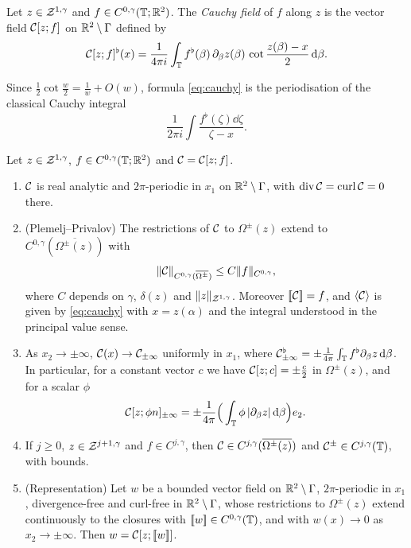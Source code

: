 \begin{definition}\label{def:cauchy}
Let $z\in\mathcal{Z}^{1,\gamma}$ and $f\in C^{0,\gamma}(\mathbb{T};\mathbb{R}^2)$. The \emph{Cauchy field} of $f$ along $z$ is the vector field $\mathcal{C}[z;f]$ on $\mathbb{R}^2\setminus\Gamma$ defined by
\begin{equation}\label{eq:cauchy}
\mathcal{C}[z;f]^\flat(x)=\frac1{4\pi i}\int_{\mathbb{T}} f^\flat(\beta)\,\partial_\beta z(\beta)\,\cot\frac{z(\beta)-x}{2}\,\mathrm{d}\beta .
\end{equation}
\end{definition}

Since $\frac12\cot\frac w2=\frac1w+O(w)$, formula \eqref{eq:cauchy} is the periodisation of the classical Cauchy integral
\[
\frac1{2\pi i}\int\frac{f^\flat(\zeta)\dd\zeta}{\zeta-x}.
\]

\begin{lemma}\label{lem:cauchy}
Let $z\in\mathcal{Z}^{1,\gamma}$, $f\in C^{0,\gamma}(\mathbb{T};\mathbb{R}^2)$ and $\mathcal{C}=\mathcal{C}[z;f]$.
\begin{enumerate}[label=\textup{(\alph*)}]
\item $\mathcal{C}$ is real analytic and $2\pi$-periodic in $x_1$ on $\mathbb{R}^2\setminus\Gamma$, with $\operatorname{div}\mathcal{C}=\operatorname{curl}\mathcal{C}=0$ there.
\item \textup{(Plemelj--Privalov)} The restrictions of $\mathcal{C}$ to $\Omega^\pm(z)$ extend to $C^{0,\gamma}(\overline{\Omega^\pm(z)})$ with
\[
\|\mathcal{C}\|_{C^{0,\gamma}(\overline{\Omega^\pm})}\le C\|f\|_{C^{0,\gamma}},
\]
where $C$ depends on $\gamma$, $\delta(z)$ and $\|z\|_{\mathcal{Z}^{1,\gamma}}$. Moreover
$[\![\mathcal{C}]\!]=f$, and $\langle \mathcal{C}\rangle$ is given by \eqref{eq:cauchy} with $x=z(\alpha)$ and the integral understood in the principal value sense.
\item As $x_2\to\pm\infty$, $\mathcal{C}(x)\to\mathcal{C}_{\pm\infty}$ uniformly in $x_1$, where $\mathcal{C}_{\pm\infty}^\flat=\pm\frac1{4\pi}\int_{\mathbb{T}} f^\flat\partial_\beta z\,\mathrm{d}\beta$.
In particular, for a constant vector $c$ we have $\mathcal{C}[z;c]=\pm\frac c2$ in $\Omega^\pm(z)$, and for a scalar $\phi$
\begin{equation}\label{eq:limit-source}
\mathcal{C}[z;\phi n]_{\pm\infty}=\pm\frac1{4\pi}\Big(\int_{\mathbb{T}}\phi\,|\partial_\beta z|\,\mathrm{d}\beta\Big)e_2 .
\end{equation}
\item If $j\ge0$, $z\in\mathcal{Z}^{j+1,\gamma}$ and $f\in C^{j,\gamma}$, then $\mathcal{C}\in C^{j,\gamma}(\overline{\Omega^\pm(z)})$ and $\mathcal{C}^\pm\in C^{j,\gamma}(\mathbb{T})$, with bounds.
\item \textup{(Representation)} Let $w$ be a bounded vector field on $\mathbb{R}^2\setminus\Gamma$, $2\pi$-periodic in $x_1$, divergence-free and curl-free in $\mathbb{R}^2\setminus\Gamma$, whose restrictions
to $\Omega^\pm(z)$ extend continuously to the closures with $[\![w]\!]\in C^{0,\gamma}(\mathbb{T})$, and with $w(x)\to0$ as $x_2\to\pm\infty$. Then $w=\mathcal{C}[z;[\![w]\!]]$.
\end{enumerate}
\end{lemma}

